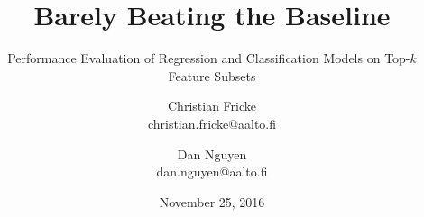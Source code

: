 
\title{Barely Beating the Baseline}
\subtitle{Performance Evaluation of Regression and Classification Models on
  Top-$k$ Feature Subsets}

\author{
  Christian Fricke\\[-.2em]
  \large christian.fricke@aalto.fi
  \and
   Dan Nguyen\\[-.2em]
  \large dan.nguyen@aalto.fi
}

\date{\large November 25, 2016}

\maketitle

